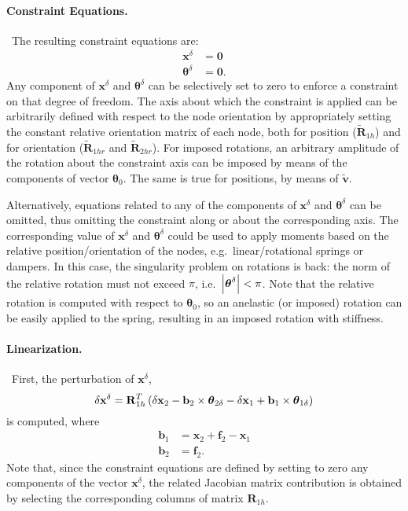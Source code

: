 \documentclass[10pt,dvips,fleqn,subeqn]{report}
\newcommand{\T}[1]{\bm{\mathbf{#1}}}
\begin{document}
\paragraph{Constraint Equations.} \
The resulting constraint equations are:
\begin{subequations}
\begin{align}
	\T{x}^{\delta} &= \T{0}
	\label{TOTAL-JOINT:constraint-x} \\
	\T{\theta}^{\delta} &= \T{0} .
	\label{TOTAL-JOINT:constraint-theta}
\end{align}
\end{subequations}
Any component of $\T{x}^{\delta}$ and $\T{\theta}^{\delta}$
can be selectively set to zero to enforce a constraint
on that degree of freedom.
The axis about which the constraint is applied can be arbitrarily 
defined with respect to the node orientation
by appropriately setting the constant relative orientation
matrix of each node, both for position ($\tilde{\T{R}}_{1h}$) 
and for orientation ($\tilde{\T{R}}_{1hr}$ and $\tilde{\T{R}}_{2hr}$).
For imposed rotations, an arbitrary amplitude of the rotation about 
the constraint axis can be imposed by means of the components 
of vector $\T{\theta}_0$.
The same is true for positions, by means of $\tilde{\T{v}}$. 

Alternatively, equations related to any of the components
of $\T{x}^{\delta}$ and $\T{\theta}^{\delta}$ can be omitted,
thus omitting the constraint along or about the corresponding axis.
The corresponding value of  $\T{x}^{\delta}$ and $\T{\theta}^{\delta}$ 
could be used to apply moments based on the relative position/orientation 
of the nodes, e.g.\ linear/rotational springs or dampers.
In this case, the singularity problem on rotations is back: the norm
of the relative rotation must not exceed $\pi$, i.e.\
$\shbr{\T{\theta}^{\delta}}<\pi$.
Note that the relative rotation is computed with respect to 
$\T{\theta}_0$, so an anelastic (or imposed) rotation can be easily
applied to the spring, resulting in an imposed rotation with stiffness.

\paragraph{Linearization.} \
First, the perturbation of $\T{x}^{\delta}$,
\begin{equation}
	\delta \T{x}^{\delta} = 
	\T{R}_{1h}^T\plbr{
		\delta\T{x}_2 - \T{b}_2 \times \T{\theta}_{2\delta}
		- \delta\T{x}_1 + \T{b}_1 \times \T{\theta}_{1\delta}
	}
\end{equation}
is computed, where
\begin{subequations}
\begin{align}
	\T{b}_1 &= \T{x}_2 + \T{f}_2 - \T{x}_1 \\
	\T{b}_2 &= \T{f}_2 .
\end{align}
\end{subequations}
Note that, since the constraint equations are defined by setting 
to zero any components of the vector $\T{x}^{\delta}$, the
related Jacobian matrix contribution is obtained by selecting 
the corresponding columns of matrix $\T{R}_{1h}$.
\end{document}
